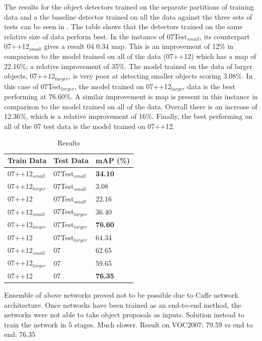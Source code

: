 The results for the object detectors trained on the separate partitions of training data and a the baseline detector trained on all the data against the three sets of tests can be seen in . The table shows that the detectors trained on the same relative size of data perform best. In the instance of 07Test$_{small}$, its counterpart 07++12$_{small}$ gives a result 04 0.34 \gls{map}. This is an improvement of 12\% in comparison to the model trained on all of the data (07++12) which has a \gls{map} of 22.16\%; a relative improvement of 35\%. The model trained on the data of larger objects, 07++12$_{larger}$, is very poor at detecting smaller objects scoring 3.08\%. In this case of 07Test$_{larger}$, the model trained on 07++12$_{larger}$ data is the best performing at 76.60\%. A similar improvement is \gls{map} is present in this instance in comparison to the model trained on all of the data. Overall there is an increase of 12.36\%, which is a relative improvement of 16\%. Finally, the best performing on all of the 07 test data is the model trained on 07++12.


\begin{table}[h]
\centering
\caption{Results}
\label{tab:resresults}
\begin{tabular}{|l|l|l|}
\hline
\textbf{Train Data}    & \textbf{Test Data}     & \textbf{mAP (\%)} \\ \hline
07++12$_{small}$ & 07Test$_{small}$  & \textbf{34.10}   \\ \hline
07++12$_{larger}$  & 07Test$_{small}$ & 3.08     \\ \hline
07++12   & 07Test$_{small}$           & 22.16    \\ \hline
07++12$_{small}$ & 07Test$_{larger}$  &  36.40   \\ \hline
07++12$_{larger}$ & 07Test$_{larger}$ &  \textbf{76.60}   \\ \hline
07++12 & 07Test$_{larger}$           &  64.34   \\ \hline
07++12$_{small}$       & 07   & 62.65    \\ \hline
07++12$_{larger}$       & 07  &  59.65   \\ \hline
07++12        & 07            &  \textbf{76.35}   \\ \hline 
\end{tabular}
\end{table}


Ensemble of above networks proved not to be possible due to Caffe network architecture. Once networks have been trained as an end-to-end method, the networks were not able to take object proposals as inputs. Solution instead to train the network in 5 stages. Much slower. Result on VOC2007: 79.59 vs end to end: 76.35 

